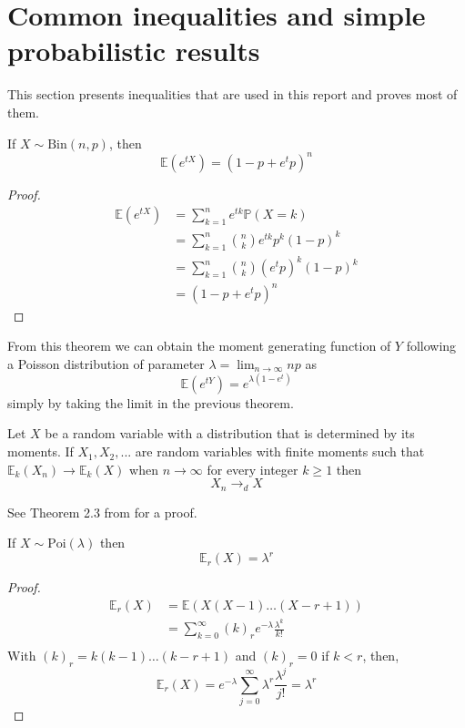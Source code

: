 \section{Common inequalities and simple probabilistic results}
This section presents inequalities that are used in this report and proves most of them.
\begin{theorem}\label{binMGF}
	If $X \sim \text{Bin}(n, p)$, then 
	\begin{equation}
		\mathbb{E}(e^{tX}) = (1 - p + e^t p)^n
	\end{equation}
\end{theorem}
\begin{proof}
	\begin{align}
		\mathbb{E}(e^{tX}) 	&= \sum_{k=1}^n e^{tk} \mathbb{P}(X =k) \\
					&= \sum_{k=1}^n \binom{n}{k} e^{tk}p^k(1-p)^k  \\
					&= \sum_{k=1}^n \binom{n}{k} (e^tp)^k(1-p)^k  \\
					&=(1 - p + e^t p)^n
	\end{align}
\end{proof}
From this theorem we can obtain the moment generating function of $Y$ following a Poisson distribution of parameter $\lambda = \lim_{n\to \infty} np$ as
\begin{equation}
	\mathbb{E}(e^{tY}) = e^{\lambda(1-e^t)}
\end{equation}
simply by taking the limit in the previous theorem.
\begin{theorem}
	Let $X$ be a random variable with a distribution that is determined by its moments. If $X_1, X_2, ...$ are random variables with finite moments such that
	$\mathbb{E}_k(X_n) \longrightarrow \mathbb{E}_k(X)$ when $ n \to \infty$ for every integer $k \geq 1$ then
	\begin{equation}
		X_n \longrightarrow_d X
	\end{equation}
\end{theorem}
See Theorem 2.3 from \cite{Hofstad16} for a proof.
\begin{theorem}\label{th:factPois}
	If $X \sim \text{Poi}(\lambda)$ then
	\begin{equation}
		\mathbb{E}_r(X) = \lambda^r
	\end{equation}
\end{theorem}
\begin{proof}
	\begin{align}
		\mathbb{E}_r(X) &= \mathbb{E}(X(X-1)\ldots(X-r+1)) \\
		&= \sum_{k=0}^{\infty} (k)_r e^{-\lambda} \frac{\lambda^k}{k!} \\
	\end{align}
	With $(k)_r = k(k-1)\ldots(k-r+1)$ and $(k)_r = 0$ if $k<r$, then,
	\begin{equation}
		\mathbb{E}_r(X) = e^{-\lambda}\sum_{j=0}^{\infty} \lambda^r \frac{\lambda^j}{j!} = \lambda^r
	\end{equation}
\end{proof}
